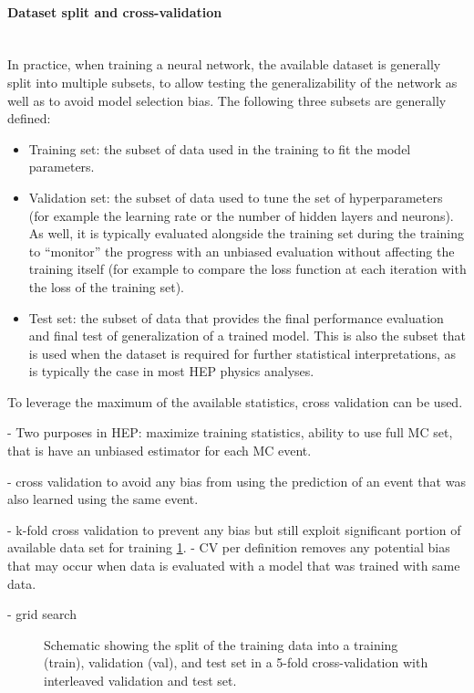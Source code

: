 \paragraph{Dataset split and cross-validation}\mbox{}\\
In practice, when training a neural network, the available dataset is generally split into multiple subsets, to allow testing the generalizability of the network as well as to avoid model selection bias.
The following three subsets are generally defined:
\begin{itemize}
    \item Training set: the subset of data used in the training to fit the model parameters.
    \item Validation set: the subset of data used to tune the set of hyperparameters (for example the learning rate or the number of hidden layers and neurons). As well, it is typically evaluated alongside the training set during the training to ``monitor'' the progress with an unbiased evaluation without affecting the training itself (for example to compare the loss function at each iteration with the loss of the training set). 
    \item Test set: the subset of data that provides the final performance evaluation and final test of generalization of a trained model. This is also the subset that is used when the dataset is required for further statistical interpretations, as is typically the case in most HEP physics analyses.
\end{itemize}

To leverage the maximum of the available statistics, cross validation can be used. 

- Two purposes in HEP: maximize training statistics, ability to use full MC set, that is have an unbiased estimator for each MC event.

- cross validation to avoid any bias from using the prediction of an event that was also learned using the same event.

- k-fold cross validation to prevent any bias but still exploit significant portion of available data set for training \cref{fig:k-fold-method}.
- CV per definition removes any potential bias that may occur when data is evaluated with a model that was trained with same data.


- grid search



\begin{figure}[t]
    \caption{Schematic showing the split of the training data into a training (train), validation (val), and test set in a 5-fold cross-validation with interleaved validation and test set.}
    \label{fig:k-fold-method}
\end{figure}
